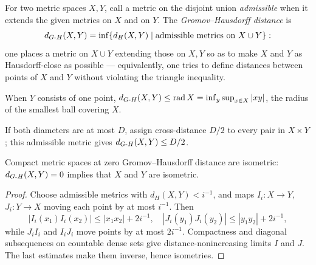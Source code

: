 \begin{definition}
  \label{def:pet-ch11-gromov-hausdorff-distance}

  For two metric spaces $X,Y$, call a metric on the disjoint union
  \emph{admissible} when it extends the given metrics on $X$ and on $Y$. The
  \emph{Gromov--Hausdorff distance} is
  \[
    d_{G\text{-}H}(X,Y)=\inf\{d_H(X,Y)\mid\text{admissible metrics on }X\cup Y\}:
  \]
  one places a metric on $X\cup Y$ extending those on $X,Y$ so as to make $X$
  and $Y$ as Hausdorff-close as possible — equivalently, one tries to define
  distances between points of $X$ and $Y$ without violating the triangle
  inequality.
\end{definition}

\begin{example}
  \label{ex:pet-ch11-gh-distance-radius}

  When $Y$ consists of one point,
  $d_{G\text{-}H}(X,Y)\le\operatorname{rad}X=\inf_{y}\sup_{x\in X}|xy|$, the radius of
  the smallest ball covering $X$.
\end{example}

\begin{example}
  \label{ex:pet-ch11-gh-distance-diameter-bound}

  If both diameters are at most $D$, assign cross-distance $D/2$ to every
  pair in $X\times Y$; this admissible metric gives $d_{G\text{-}H}(X,Y)\le D/2$.
\end{example}

\begin{proposition}
  \label{prop:pet-ch11-gh-distance-zero-isometric}

  Compact metric spaces at zero Gromov--Hausdorff distance are isometric:
  $d_{G\text{-}H}(X,Y)=0$ implies that $X$ and $Y$ are isometric.
\end{proposition}
\begin{proof}
  \sketch
  Choose admissible metrics with \(d_H(X,Y)<i^{-1}\), and maps \(I_i:X\to Y\), \(J_i:Y\to X\) moving each point by at most \(i^{-1}\). Then
  \[
    |I_i(x_1)I_i(x_2)|\le |x_1x_2|+2i^{-1},\quad
    |J_i(y_1)J_i(y_2)|\le |y_1y_2|+2i^{-1},
  \]
  while \(J_iI_i\) and \(I_iJ_i\) move points by at most \(2i^{-1}\). Compactness and diagonal subsequences on countable dense sets give distance-nonincreasing limits \(I\) and \(J\). The last estimates make them inverse, hence isometries.
\end{proof}


